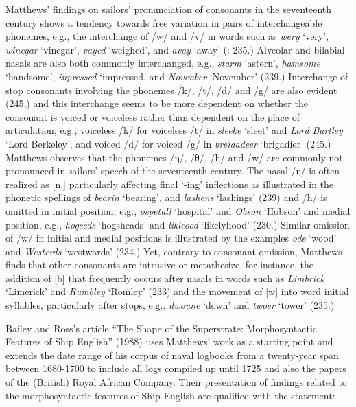 Matthews’ findings on sailors’ pronunciation of consonants in the seventeenth century shows a tendency towards free variation in pairs of interchangeable phonemes, e.g., the interchange of /w/ and /v/ in words such as \textit{wery} ‘very’, \textit{winegar} ‘vinegar’, \textit{vayed} ‘weighed’, and \textit{avay} ‘away’ (\citealt{Matthews1935}: 235.) Alveolar and bilabial nasals are also both commonly interchanged, e.g., \textit{starm} ‘astern’, \textit{hamsome} ‘handsome’, \textit{inpressed} ‘impressed, and \textit{Novenber} ‘November’ (239.) Interchange of stop consonants involving the phonemes /k/, /t/, /d/ and /g/ are also evident (245,) and this interchange seems to be more dependent on whether the consonant is voiced or voiceless rather than dependent on the place of articulation, e.g., voiceless /k/ for voiceless /t/ in \textit{sleeke} ‘sleet’ and \textit{Lord} \textit{Bartley} ‘Lord Berkeley’, and voiced /d/ for voiced /g/ in \textit{breidadeer} ‘brigadier’ (245.) Matthews observes that the phonemes /ŋ/, /θ/, /h/ and /w/ are commonly not pronounced in sailors’ speech of the seventeenth century. The nasal /ŋ/ is often realized as [n,] particularly affecting final ‘-ing’ inflections as illustrated in the phonetic spellings of \textit{bearin} ‘bearing’, and \textit{lashens} ‘lashings’ (239) and /h/ is omitted in initial position, e.g., \textit{ospetall} ‘hospital’ and \textit{Obson} ‘Hobson’ and medial position, e.g., \textit{hogseds} ‘hogsheads’ and \textit{likleood} ‘likelyhood’ (230.) Similar omission of /w/ in initial and medial positions is illustrated by the examples \textit{ode} ‘wood’ and \textit{Westerds} ‘westwards’ (234.) Yet, contrary to consonant omission, Matthews finds that other consonants are intrusive or metathesize, for instance, the addition of [b] that frequently occurs after nasals in words such as \textit{Limbrick} ‘Limerick’ and \textit{Rumbley} ‘Romley’ (233) and the movement of [w] into word initial syllables, particularly after stops, e.g., \textit{dwoune} ‘down’ and \textit{twoer} ‘tower’ (235.)

Bailey and Ross’s article “The Shape of the Superstrate: Morphosyntactic Features of Ship English” (1988) uses Matthews’ work as a starting point and extends the date range of his corpus of naval logbooks from a twenty-year span between 1680-1700 to include all logs compiled up until 1725 and also the papers of the (British) Royal African Company. Their presentation of findings related to the morphosyntactic features of Ship English are qualified with the statement:

